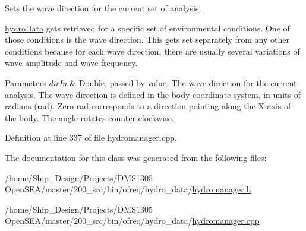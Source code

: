 Sets the wave direction for the current set of analysis. 

\hyperlink{classosea_1_1ofreq_1_1hydro_data}{hydro\-Data} gets retrieved for a specific set of environmental conditions. One of those conditions is the wave direction. This gets set separately from any other conditions because for each wave direction, there are usually several variations of wave amplitude and wave frequency. 
\begin{DoxyParams}{Parameters}
{\em dir\-In} & Double, passed by value. The wave direction for the current analysis. The wave direction is defined in the body coordinate system, in units of radians (rad). Zero rad corresponds to a direction pointing along the X-\/axis of the body. The angle rotates counter-\/clockwise. \\
\hline
\end{DoxyParams}


Definition at line 337 of file hydromanager.\-cpp.



The documentation for this class was generated from the following files\-:\begin{DoxyCompactItemize}
\item 
/home/\-Ship\-\_\-\-Design/\-Projects/\-D\-M\-S1305 Open\-S\-E\-A/master/200\-\_\-src/bin/ofreq/hydro\-\_\-data/\hyperlink{hydromanager_8h}{hydromanager.\-h}\item 
/home/\-Ship\-\_\-\-Design/\-Projects/\-D\-M\-S1305 Open\-S\-E\-A/master/200\-\_\-src/bin/ofreq/hydro\-\_\-data/\hyperlink{hydromanager_8cpp}{hydromanager.\-cpp}\end{DoxyCompactItemize}
